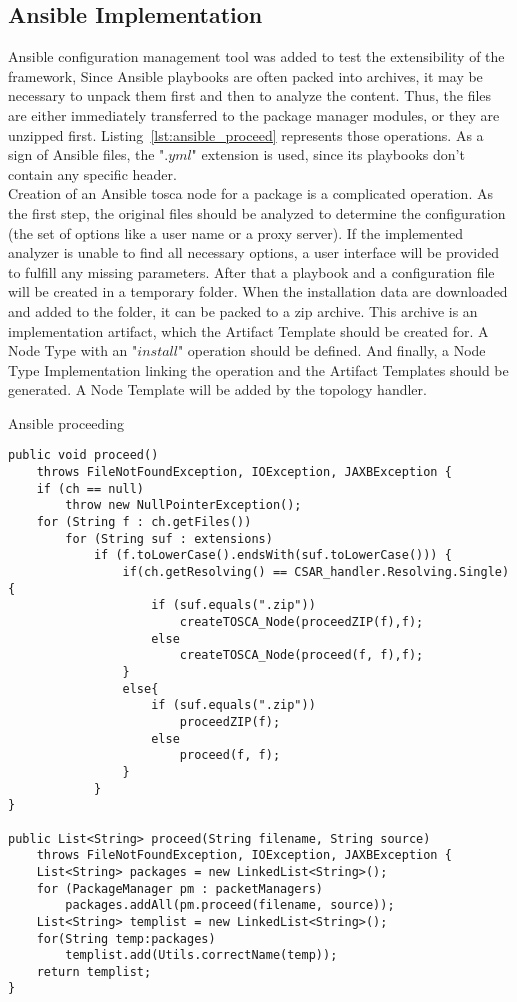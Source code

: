 \subsection*{Ansible Implementation}
Ansible configuration management tool was added to test the extensibility of the framework,
Since Ansible playbooks are often packed into archives, it may be necessary to unpack them first and then to analyze the content.
Thus, the files are either immediately transferred to the package manager modules, or they are unzipped first.
Listing~\ref{lst:ansible_proceed} represents those operations.
As a sign of Ansible files, the ".$yml$" extension is used, since its playbooks don't contain any specific header.\\
Creation of an Ansible \gls{tosca} node for a package is a complicated operation. 
As the first step, the original files should be analyzed to determine the configuration (the set of options like a user name or a proxy server).
If the implemented analyzer is unable to find all necessary options, a user interface will be provided to fulfill any missing parameters.
After that a playbook and a configuration file will be created in a temporary folder.
When the installation data are downloaded and added to the folder, it can be packed to a zip archive.
This archive is an implementation artifact, which the Artifact Template should be created for.
A Node Type with an "$install$" operation %
should be defined.
And finally, a Node Type Implementation linking the operation and the Artifact Templates should be generated.
A Node Template will be added by the topology handler.
\begin{Listing}
	\caption{Ansible proceeding}
	\label{lst:ansible_proceed}
\begin{lstlisting}
public void proceed()
	throws FileNotFoundException, IOException, JAXBException {
	if (ch == null)
		throw new NullPointerException();
	for (String f : ch.getFiles())
		for (String suf : extensions)
			if (f.toLowerCase().endsWith(suf.toLowerCase())) {
				if(ch.getResolving() == CSAR_handler.Resolving.Single){
					if (suf.equals(".zip")) 
						createTOSCA_Node(proceedZIP(f),f);
					else
						createTOSCA_Node(proceed(f, f),f);
				}
				else{
					if (suf.equals(".zip")) 
						proceedZIP(f);
					else
						proceed(f, f);
				}
			}
}
	
public List<String> proceed(String filename, String source)
	throws FileNotFoundException, IOException, JAXBException {
	List<String> packages = new LinkedList<String>();
	for (PackageManager pm : packetManagers)
		packages.addAll(pm.proceed(filename, source));
	List<String> templist = new LinkedList<String>();
	for(String temp:packages)
		templist.add(Utils.correctName(temp));
	return templist;
}
\end{lstlisting}
\end{Listing}

